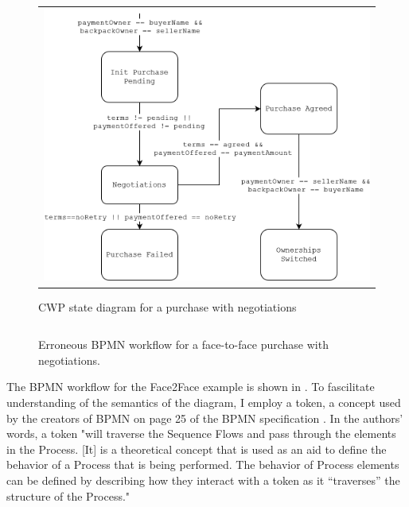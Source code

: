 \begin{figure}[t]
  \begin{center}
    \begin{tabular}{c}
        \includegraphics[width=\textwidth]{paper/figs/CWP/purchase_CWP.png}
    \end{tabular}
  \end{center}
\caption{CWP state diagram for a purchase with negotiations}
\label{fig:purchase_cwp}
\end{figure}


\begin{figure}[t]
  \begin{center}
    \begin{tabular}{c}
        
    \end{tabular}
  \end{center}
\caption{Erroneous BPMN workflow for a face-to-face purchase with negotiations.}
\label{fig:face2face_error_bpmn}
\end{figure}

The BPMN workflow for the Face2Face example is shown in . To fascilitate understanding of the semantics of the diagram, I employ a token, a concept used by the creators of BPMN on page 25 of the BPMN specification \cite{BPMNSpecification}. In the authors' words, a token "will traverse the Sequence Flows and pass through the elements in the Process. [It] is a theoretical concept that is used as an aid to define the behavior of a Process that is being performed. The behavior of Process elements can be defined by describing how they interact with a token as it “traverses” the structure of the Process."

